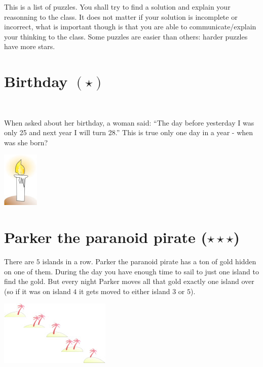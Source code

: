 \documentclass[11pt]{article}
\title{}
\date{}
\author{}
\begin{document}


This is a list of puzzles. You shall try to find a solution and explain your
reasonning to the class. It does not matter if your solution is incomplete or
incorrect, what is important though is that you are able to communicate/explain
your thinking to the class. Some puzzles are easier than others: harder puzzles
have more stars.

\section{Birthday $(\star)$}
\noindent\\[-12mm]
\begin{minipage}{.7\textwidth}
When asked about her birthday, a woman said: ``The day before yesterday I was
only 25 and next year I will turn 28.'' This is true only one day in a year -
when was she born?
\end{minipage}
\begin{minipage}{.3\textwidth}
  \begin{center}
    \includegraphics[scale=1]{candle.jpg}
  \end{center}
\end{minipage}

\section{Parker the paranoid pirate ($\star\star\star$)}
\noindent
\begin{minipage}{.7\textwidth}
There are $5$ islands in a row. Parker the paranoid pirate has a ton of gold
hidden on one of them. During the day you have enough time to sail to just one
island to find the gold. But every night Parker moves all that gold exactly one
island over (so if it was on island $4$ it gets moved to either island $3$ or
$5$).
\end{minipage}
\begin{minipage}{.3\textwidth}
  \begin{center}
    \includegraphics[scale=.7]{islands.jpg}
  \end{center}
\end{minipage}
\end{document}
